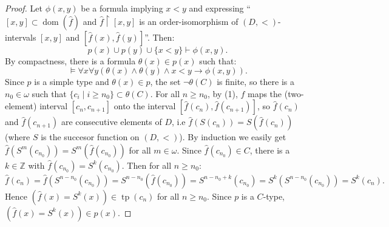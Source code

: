 \documentclass[10pt,a4paper]{amsart}
\theoremstyle{definition}
\DeclareMathOperator{\tp}{tp}
\DeclareMathOperator{\dom}{dom}
\begin{document}
\begin{proof}
Let $\phi(x,y)$ be a formula implying $x<y$ and expressing  ``$[x,y]\subset \dom (\hat f)$ and $\hat f\restriction[x,y]$ is an order-isomorphism of $(D,<)$-intervals $[x,y]$ and $[\hat f(x),\hat f(y)]$''. Then:
$$ p(x)\cup p(y)\cup\{x<y\}\vdash \phi(x,y).$$
By compactness, there is a formula $\theta(x)\in p(x)$   such that:
\begin{equation}
\models  \forall x\forall y  (\theta(x)\land \theta(y)\land x<y\rightarrow \phi(x,y)).
\end{equation}
Since $p$ is a simple type and $\theta(x)\in p$, the set $\lnot\theta(C)$ is finite, so there is a $n_0\in \omega$ such that $\{c_i\mid i\geq n_0\}\subset \theta(C)$. For all $n\geq n_0$, by (1),  $f$ maps the (two-element) interval $[c_n,c_{n+1}]$ onto the interval $[\hat f(c_n),\hat f(c_{n+1})]$, so  
$\hat f(c_n)$ and $\hat f(c_{n+1})$ are consecutive elements of $D$, i.e $\hat f(S(c_n))=S(\hat f(c_n))$ (where $S$ is the succesor function on $(D,<)$). By induction we easily get  $\hat f(S^m(c_{n_0}))=S^m(\hat f(c_{n_0}))$ for all $m\in \omega$. Since $\hat f(c_{n_0})\in C$, there is a $k\in \mathbb Z$ with $\hat f(c_{n_0})=S^k(c_{n_0})$. Then for all $n\geq n_0$: 
$$\hat f(c_n)=\hat f(S^{n-n_0}(c_{n_0}))=    S^{n-n_0}(\hat f(c_{n_0}))=S^{n-n_0+k}(c_{n_0})=S^k(S^{n-n_0}(c_{n_0}))=S^k(c_n).$$ 
Hence  $(\hat f(x)=S^k(x))\in \tp(c_n)$ for  all $n\geq n_0$.  Since $p$ is a $C$-type, $(\hat f(x)=S^k(x))\in p(x)$.
\end{proof}
 
\end{document}
